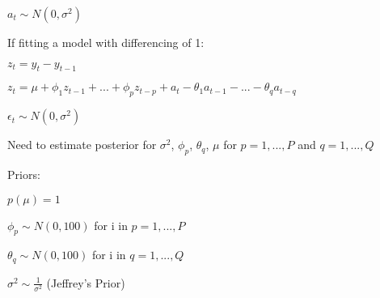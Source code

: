 \documentclass[11pt]{article}
\begin{document}
\(a_t \sim N(0, \sigma^2)\)

If fitting a model with differencing of 1:

\(z_t = y_t - y_{t-1}\)

\(z_t = \mu + \phi_1 z_{t-1} + ... +\phi_p z_{t-p}+ a_t -\theta_1 a_{t-1}-...-\theta_q a_{t-q}\)

\(\epsilon_t \sim N(0, \sigma^2)\)

Need to estimate posterior for \(\sigma^2\), \(\phi_p\), \(\theta_q\),
\(\mu\) for \(p=1, ...,P\) and \(q=1,...,Q\)

Priors:

\(p(\mu) = 1\)

\(\phi_p \sim N(0, 100)\) for i in \(p=1, ...,P\)

\(\theta_q \sim N(0, 100)\) for i in \(q=1, ...,Q\)

\(\sigma^2 \sim \frac{1}{\sigma^2}\) (Jeffrey's Prior)
\end{document}
